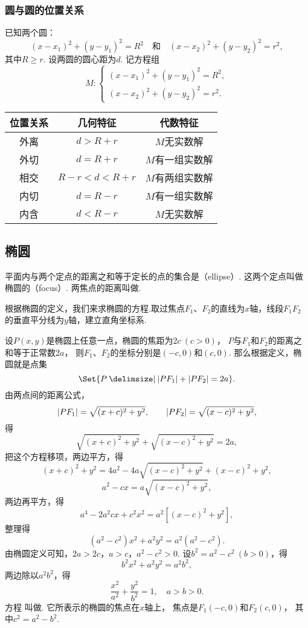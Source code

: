 \subsubsection{圆与圆的位置关系}
已知两个圆：\[
(x-x_1)^2+(y-y_1)^2=R^2
\quad\text{和}\quad
(x-x_2)^2+(y-y_2)^2=r^2,
\]其中\(R \geq r\).
设两圆的圆心距为\(d\).
记方程组\[
M: \begin{cases}
(x-x_1)^2+(y-y_1)^2=R^2, \\
(x-x_2)^2+(y-y_2)^2=r^2.
\end{cases}
\]
\begin{center}
\begin{tabular}{*3{c}}
\hline
位置关系 & 几何特征 & 代数特征 \\ \hline
外离 & \(d>R+r\) & \(M\)无实数解 \\
外切 & \(d=R+r\) & \(M\)有一组实数解 \\
相交 & \(R-r<d<R+r\) & \(M\)有两组实数解 \\
内切 & \(d=R-r\) & \(M\)有一组实数解 \\
内含 & \(d<R-r\) & \(M\)无实数解 \\
\hline
\end{tabular}
\end{center}

\subsection{椭圆}
\begin{definition}
平面内与两个定点的距离之和等于定长的点的集合是（ellipse）.
这两个定点叫做椭圆的（focus）.
两焦点的距离叫做.
\end{definition}

根据椭圆的定义，我们来求椭圆的方程.取过焦点\(F_1\)、\(F_2\)的直线为\(x\)轴，线段\(F_1 F_2\)的垂直平分线为\(y\)轴，建立直角坐标系.

设\(P(x,y)\)是椭圆上任意一点，椭圆的焦距为\(2c\ (c > 0)\)，
\(P\)与\(F_1\)和\(F_2\)的距离之和等于正常数\(2a\)，
则\(F_1\)、\(F_2\)的坐标分别是\((-c,0)\)和\((c,0)\).
那么根据定义，椭圆就是点集\[
	\Set{ P \given \abs{P F_1} + \abs{P F_2} = 2a }.
\]
由两点间的距离公式，\[
	\abs{P F_1} = \sqrt{(x+c)^2+y^2}, \qquad
	\abs{P F_2} = \sqrt{(x-c)^2+y^2},
\]得\[
	\sqrt{(x+c)^2+y^2} + \sqrt{(x-c)^2+y^2} = 2a,
\]
把这个方程移项，两边平方，得\[
	(x+c)^2+y^2 = 4a^2 - 4a\sqrt{(x-c)^2+y^2} + (x-c)^2+y^2,
\]\[
	a^2 - cx = a\sqrt{(x-c)^2+y^2},
\]两边再平方，得\[
	a^4 - 2 a^2 cx + c^2 x^2 = a^2 [(x-c)^2+y^2],
\]整理得\[
	(a^2 - c^2) x^2 + a^2 y^2 = a^2 (a^2 - c^2).
\]由椭圆定义可知，\(2a > 2c\)，\(a > c\)，\(a^2 - c^2 > 0\).
设\(b^2 = a^2 - c^2\ (b > 0)\)，得\[
	b^2 x^2 + a^2 y^2 = a^2 b^2,
\]
两边除以\(a^2 b^2\)，得\begin{equation}\label{equation:解析几何.椭圆的标准方程1}
	\frac{x^2}{a^2} + \frac{y^2}{b^2} = 1,
	\quad a > b > 0.
\end{equation}
方程  叫做.
它所表示的椭圆的焦点在\(x\)轴上，
焦点是\(F_1(-c,0)\)和\(F_2(c,0)\)，
其中\(c^2 = a^2 - b^2\).

